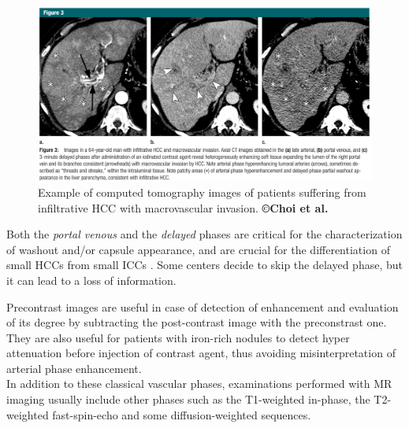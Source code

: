 \documentclass[]{article}
\begin{document}
\begin{figure}[th!]
\centering
\includegraphics[width=0.9\linewidth]{images/image15}
\caption{Example of computed tomography images of patients suffering from infiltrative HCC with macrovascular invasion. \textbf{©Choi et al. \cite{Choi2014a}}}
\label{Choi2014a_Fig3}
\end{figure}

Both the \emph{portal venous} and the \emph{delayed} phases are critical
for the characterization of washout and/or capsule appearance, and are
crucial for the differentiation of small HCCs from small
ICCs \cite{Iannaccone2005,Rimola2009}. Some centers decide
to skip the delayed phase, but it can lead to a loss of information.

Precontrast images are useful in case of detection of enhancement
and evaluation of its degree by subtracting the post-contrast image with
the preconstrast one. They are also useful for patients with iron-rich
nodules to detect hyper attenuation before injection of contrast agent,
thus avoiding misinterpretation of arterial phase enhancement.\\
In addition to these classical vascular phases, examinations performed
with MR imaging usually include other phases such as the T1-weighted
in-phase, the T2-weighted fast-spin-echo and some diffusion-weighted
sequences.\\
\end{document}
